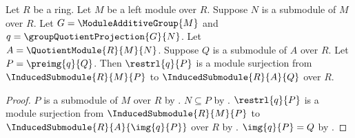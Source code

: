 \begin{theorem}\label{module_quotient_correspondence_preimage_transport}
    Let $R$ be a ring.
    Let $M$ be a left module over $R$.
    Suppose $N$ is a submodule of $M$ over $R$.
    Let $G=\ModuleAdditiveGroup{M}$ and
        $q=\groupQuotientProjection{G}{N}$.
    Let $A=\QuotientModule{R}{M}{N}$.
    Suppose $Q$ is a submodule of $A$ over $R$.
    Let $P=\preimg{q}{Q}$.
    Then $\restrl{q}{P}$ is a module surjection from
        $\InducedSubmodule{R}{M}{P}$ to
        $\InducedSubmodule{R}{A}{Q}$ over $R$.
\end{theorem}
\begin{proof}
    $P$ is a submodule of $M$ over $R$ by
        .
    $N\subseteq P$ by
        .
    $\restrl{q}{P}$ is a module surjection from
        $\InducedSubmodule{R}{M}{P}$ to
        $\InducedSubmodule{R}{A}{\img{q}{P}}$ over $R$ by
        .
    $\img{q}{P}=Q$ by
        .
\end{proof}

